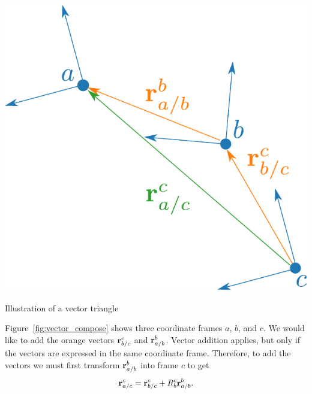 \begin{marginfigure}
\includegraphics[width=\linewidth]{chap2_preliminaries/figures/vector_composition}
\caption{Illustration of a vector triangle}
\label{fig:vector_compose}
\end{marginfigure}
Figure~\ref{fig:vector_compose} shows three coordinate frames $a$, $b$, and $c$.
We would like to add the orange vectors $\mathbf{r}_{b/c}^c$ and $\mathbf{r}_{a/b}^b$.  
Vector addition applies, but only if the vectors are expressed in the same coordinate frame.  Therefore, to add the vectors we must first transform $\mathbf{r}_{a/b}^b$ into frame $c$ to get
\[
\mathbf{r}_{a/c}^{c}=\mathbf{r}_{b/c}^c + R_{b}^{c}\mathbf{r}_{a/b}^b.
\]
%
%
%
%
%
%


